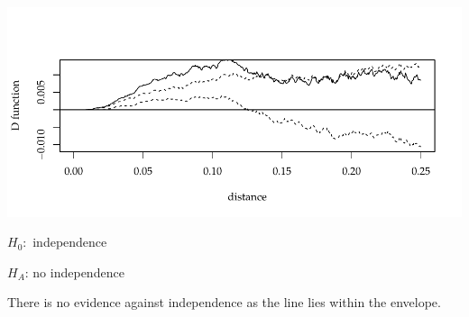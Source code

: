 \documentclass{article}\usepackage[]{graphicx}\usepackage[]{color}
\makeatletter
\def\maxwidth{ %
  \ifdim\Gin@nat@width>\linewidth
    \linewidth
  \else
    \Gin@nat@width
  \fi
}
\newenvironment{knitrout}{}{} %
\makeatother
\begin{document}
\begin{enumerate}
\begin{knitrout}
{\centering \includegraphics[width=\maxwidth]{figure/rand_label12-1} 

}



\end{knitrout}

$H_{0}:$ independence

$H_{A}$: no independence

There is no evidence against independence as the line lies within the envelope.


\end{enumerate}
\end{document}
